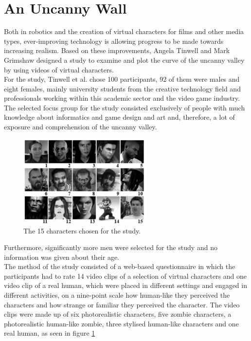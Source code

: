 \section{An Uncanny Wall}
Both in robotics and the creation of virtual characters for films and other media types, ever-improving technology is allowing progress to be made towards increasing realism. Based on these improvements, Angela Tinwell and Mark Grimshaw \cite{uncanny_wall} designed a study to examine and plot the curve of the uncanny valley by using videos of virtual characters.\\
For the study, Tinwell et al. chose 100 participants, 92 of them were males and eight females, mainly university students from the creative technology field and professionals working within this academic sector and the video game industry. The selected focus group for the study consisted exclusively of people with much knowledge about informatics and game design and art and, therefore, a lot of exposure and comprehension of the uncanny valley.
\begin{figure} %
    \centering
    \includegraphics[width=0.6\textwidth]{graphics/uncanny_wall.png}
    \caption{The 15 characters chosen for the study.}
    \label{fig:uncannyWall}
\end{figure}
Furthermore, significantly more men were selected for the study and no information was given about their age.\\
The method of the study consisted of a web-based questionnaire in which the participants had to rate 14 video clips of a selection of virtual characters and one video clip of a real human, which were placed in different settings and engaged in different activities, on a nine-point scale how human-like they perceived the characters and how strange or familiar they perceived the character. The video clips were made up of six photorealistic characters, five zombie characters, a photorealistic human-like zombie, three stylised human-like characters and one real human, as seen in figure \ref{fig:uncannyWall}\\
